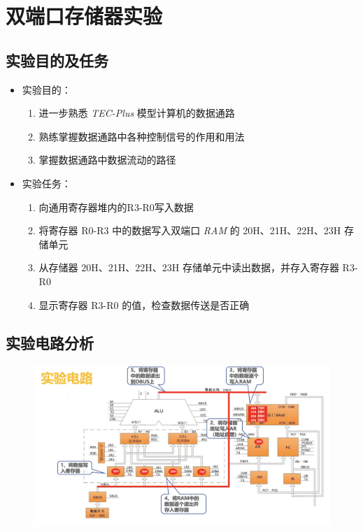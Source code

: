 \section{双端口存储器实验}
    \subsection{实验目的及任务}
        \begin{itemize}
            \item 实验目的：
            \begin{enumerate}
                \item 进一步熟悉 \textit{TEC-Plus} 模型计算机的数据通路
                \item 熟练掌握数据通路中各种控制信号的作用和用法
                \item 掌握数据通路中数据流动的路径
            \end{enumerate}
            \item 实验任务：
            \begin{enumerate}
                \item 向通用寄存器堆内的R3-R0写入数据
                \item 将寄存器 R0-R3 中的数据写入双端口 \textit{RAM} 的 20H、21H、22H、23H 存储单元
                \item 从存储器 20H、21H、22H、23H 存储单元中读出数据，并存入寄存器 R3-R0
                \item 显示寄存器 R3-R0 的值，检查数据传送是否正确
            \end{enumerate}
        \end{itemize}
    
    \subsection{实验电路分析}
        \begin{figure}[htbp]
            \centering
            \includegraphics*[width=12cm]{3_cu.png}
        \end{figure}

